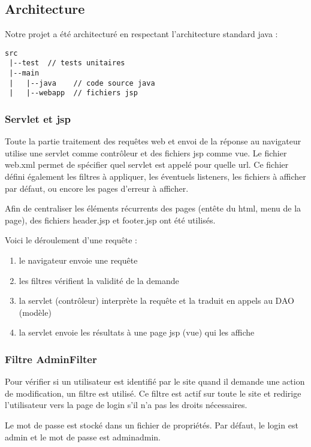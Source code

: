 \subsection{Architecture}

Notre projet a été architecturé en respectant l'architecture standard java :
\begin{verbatim}
src
 |--test  // tests unitaires
 |--main
 |   |--java    // code source java
 |   |--webapp  // fichiers jsp
\end{verbatim}

\subsubsection{Servlet et jsp}
Toute la partie traitement des requêtes web et envoi de la réponse au navigateur utilise une servlet comme contrôleur et des fichiers jsp comme vue. Le fichier web.xml permet de spécifier quel servlet est appelé pour quelle url. Ce fichier défini également les filtres à appliquer, les éventuels listeners, les fichiers à afficher par défaut, ou encore les pages d'erreur à afficher.

Afin de centraliser les éléments récurrents des pages (entête du html, menu de la page), des fichiers header.jsp et footer.jsp ont été utilisés.

Voici le déroulement d'une requête : 
\begin{enumerate}
	\item le navigateur envoie une requête
	\item les filtres vérifient la validité de la demande
	\item la servlet (contrôleur) interprète la requête et la traduit en appels au DAO (modèle)
	\item la servlet envoie les résultats à une page jsp (vue) qui les affiche
\end{enumerate}

\subsubsection{Filtre AdminFilter}
Pour vérifier si un utilisateur est identifié par le site quand il demande une action de modification, un filtre est utilisé. Ce filtre est actif sur toute le site et redirige l'utilisateur vers la page de login s'il n'a pas les droits nécessaires.

Le mot de passe est stocké dans un fichier de propriétés. Par défaut, le login est admin et le mot de passe est adminadmin.

